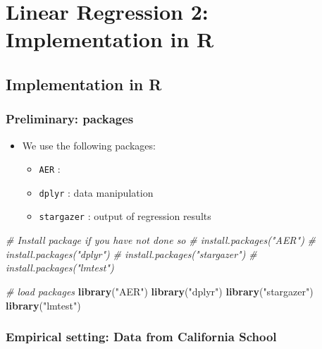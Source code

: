 \documentclass[]{book}
\newenvironment{Shaded}{\begin{snugshade}}{\end{snugshade}}
\newcommand{\KeywordTok}[1]{\textcolor[rgb]{0.13,0.29,0.53}{\textbf{#1}}}
\newcommand{\StringTok}[1]{\textcolor[rgb]{0.31,0.60,0.02}{#1}}
\newcommand{\CommentTok}[1]{\textcolor[rgb]{0.56,0.35,0.01}{\textit{#1}}}
\newcommand{\NormalTok}[1]{#1}
\providecommand{\tightlist}{%
  \setlength{\itemsep}{0pt}\setlength{\parskip}{0pt}}
\begin{document}
\chapter{Linear Regression 2: Implementation in
R}\label{linear-regression-2-implementation-in-r}

\section{Implementation in R}\label{implementation-in-r}

\subsection{Preliminary: packages}\label{preliminary-packages}

\begin{itemize}
\tightlist
\item
  We use the following packages:

  \begin{itemize}
  \tightlist
  \item
    \texttt{AER} :
  \item
    \texttt{dplyr} : data manipulation
  \item
    \texttt{stargazer} : output of regression results
  \end{itemize}
\end{itemize}

\begin{Shaded}
\begin{Highlighting}[]
\CommentTok{# Install package if you have not done so }
\CommentTok{# install.packages("AER")}
\CommentTok{# install.packages("dplyr")}
\CommentTok{# install.packages("stargazer")}
\CommentTok{# install.packages("lmtest")}

\CommentTok{# load packages}
\KeywordTok{library}\NormalTok{(}\StringTok{"AER"}\NormalTok{)}
\KeywordTok{library}\NormalTok{(}\StringTok{"dplyr"}\NormalTok{)}
\KeywordTok{library}\NormalTok{(}\StringTok{"stargazer"}\NormalTok{)}
\KeywordTok{library}\NormalTok{(}\StringTok{"lmtest"}\NormalTok{)}
\end{Highlighting}
\end{Shaded}

\subsection{Empirical setting: Data from California
School}\label{empirical-setting-data-from-california-school}
\end{document}
